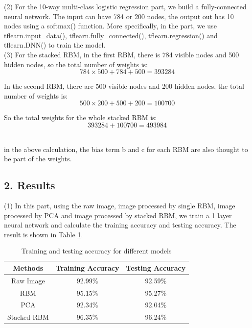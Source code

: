 \noindent (2) For the 10-way multi-class logistic regression part, we build a fully-connected neural network. The input can have 784 or 200 nodes, the output out has 10 nodes using a softmax() function. More specifically, in the part, we use tflearn.input\_data(), tflearn.fully\_connected(), tflearn.regression() and tflearn.DNN() to train the model. \\

\noindent (3) For the stacked RBM, in the first RBM, there is 784 visible nodes and 500 hidden nodes, so the total number of weights is:
\begin{equation}
784 \times 500 + 784 + 500 = 393284
\end{equation}

In the second RBM, there are 500 visible nodes and 200 hidden nodes, the total number of weights is:
\begin{equation}
500 \times 200 + 500 + 200 = 100700
\end{equation}

So the total weights for the whole stacked RBM is:
\begin{equation}
393284 + 100700 = 493984
\end{equation}\

 in the above calculation, the bias term b and c for each RBM are also thought to be part of the weights.


\newpage
\subsection*{\large 2. Results}

(1) In this part, using the raw image, image processed by single RBM, image processed by PCA and image processed by stacked RBM, we train a 1 layer neural network and calculate the training accuracy and testing accuracy. The result is shown in Table \ref{table:BESTacc}. 

\begin{table}[H]
	\centering
	\caption{Training and testing accuracy for different models}
	\label{table:BESTacc}	
	\begin{tabular}{c | c | c}
		\hline \hline
		Methods  	&	Training Accuracy 	&	Testing Accuracy \\[0.1cm]
		\hline
		Raw Image	&	92.99\%				& 	92.59\%			 \\[0.1cm]
		RBM			&	95.15\%				& 	95.27\%			 \\[0.1cm]
		PCA			& 	92.34\%				& 	92.04\%			 \\[0.1cm]
		Stacked RBM & 	96.35\%				& 	96.24\%			 \\[0.1cm]
		\hline	
	\end{tabular}
\end{table}


